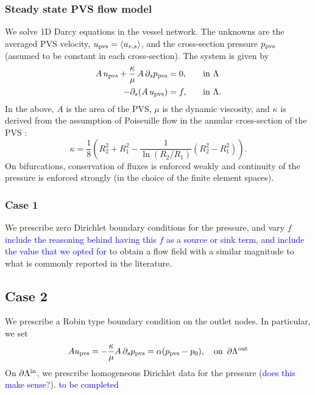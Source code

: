 \documentclass[fleqn,10pt]{wlscirep}
\newcommand{\rami}[1]{\textcolor{blue}{#1}}
\begin{document}
\subsubsection*{Steady state PVS flow model} We solve 1D Darcy equations in the vessel network. The unknowns are the averaged PVS velocity, $u_{\rm pvs} = \langle u_{v,s} \rangle$, and the cross-section pressure $p_{\rm pvs} $ (assumed to be constant in each cross-section). The system is given by  \cite{daversin2022geometrically} 
\begin{alignat}{2}
A \,  u_{\rm pvs}   + \frac{\kappa}{\mu} \, A \, \partial_{s} p_{\rm pvs} & = 0, &&  \quad \rm in  \,\, \Lambda  \\ 
-\partial_s (A \, u_{\rm pvs}) & = f, && \quad \rm in  \,\, \Lambda .  
\end{alignat} 
In the above, $A$ is the area of the PVS, $\mu$ is the dynamic viscosity, and $\kappa$ is derived from the assumption of Poiseuille
flow in the annular cross-section of the PVS \cite{daversin2022geometrically,tithof2022network}: 
\begin{equation}
\kappa = \frac18 \left( R_2^2 + R_1^2 - \frac{1}{\ln(R_2/R_1)} (R_2^2- R_1^2) \right). 
\end{equation}
On bifurcations, conservation of fluxes is enforced weakly and continuity of the pressure is enforced strongly (in the choice of the finite element spaces). 

\subsubsection*{Case 1} We prescribe zero Dirichlet boundary conditions for the pressure, and vary $f$ \rami{include the reasoning behind having this $f$ as a source or sink term, and include the value that we opted for} to obtain a flow field with a similar magnitude to what is commonly reported in the literature.  

\subsection*{Case 2} We prescribe a Robin type boundary condition on the outlet nodes. In particular, we set 
\begin{equation}
A  u_{\rm pvs} =  - \frac{\kappa}{ \mu} A\, \partial_s p_{\rm pvs} = \alpha (p_{\rm pvs} - p_0), \quad  \rm on \,\,\, \partial \Lambda^{\rm out} 
\end{equation}
On $\partial \Lambda^{\rm in}$, we prescribe homogeneous Dirichlet data for the pressure (\rami{does this make sense?}). 
\rami{to be completed }
\end{document}
